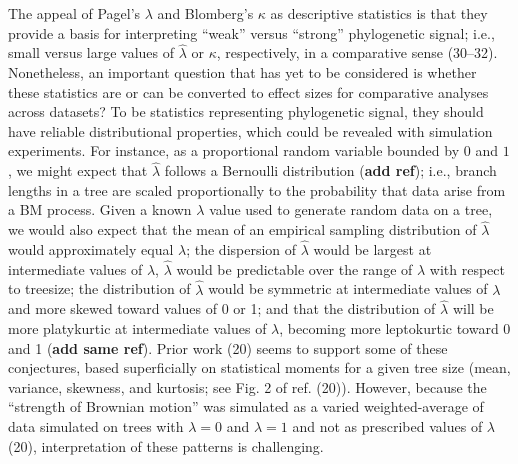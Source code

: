 \documentclass[9pt,twocolumn,twoside,lineno]{pnas-new}
\begin{document}
The appeal of Pagel's \(\lambda\) and Blomberg's \(\kappa\) as
descriptive statistics is that they provide a basis for interpreting
``weak'' versus ``strong'' phylogenetic signal; i.e., small versus large
values of \(\hat{\lambda}\) or \(\kappa\), respectively, in a
comparative sense (30--32). Nonetheless, an important question that has
yet to be considered is whether these statistics are or can be converted
to effect sizes for comparative analyses across datasets? To be
statistics representing phylogenetic signal, they should have reliable
distributional properties, which could be revealed with simulation
experiments. For instance, as a proportional random variable bounded by
\(0\) and \(1\), we might expect that \(\hat{\lambda}\) follows a
Bernoulli distribution (\textbf{add ref}); i.e., branch lengths in a
tree are scaled proportionally to the probability that data arise from a
BM process. Given a known \(\lambda\) value used to generate random data
on a tree, we would also expect that the mean of an empirical sampling
distribution of \(\hat{\lambda}\) would approximately equal \(\lambda\);
the dispersion of \(\hat{\lambda}\) would be largest at intermediate
values of \(\lambda\), \(\hat{\lambda}\) would be predictable over the
range of \(\lambda\) with respect to treesize; the distribution of
\(\hat{\lambda}\) would be symmetric at intermediate values of
\(\lambda\) and more skewed toward values of 0 or 1; and that the
distribution of \(\hat{\lambda}\) will be more platykurtic at
intermediate values of \(\lambda\), becoming more leptokurtic toward 0
and 1 (\textbf{add same ref}). Prior work (20) seems to support some of
these conjectures, based superficially on statistical moments for a
given tree size (mean, variance, skewness, and kurtosis; see Fig. 2 of
ref. (20)). However, because the ``strength of Brownian motion'' was
simulated as a varied weighted-average of data simulated on trees with
\(\lambda=0\) and \(\lambda=1\) and not as prescribed values of
\(\lambda\) (20), interpretation of these patterns is challenging.
\end{document}
